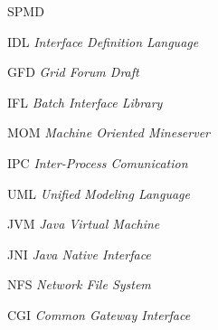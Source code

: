 \begin{listofabbrv}{SPMD}
        \item[IDL]	\emph{Interface Definition Language}
        \item[GFD]   \emph{Grid Forum Draft}
        \item[IFL]   \emph{Batch Interface Library}
        \item[MOM]   \emph{Machine Oriented Mineserver}
        \item[IPC]	\emph{Inter-Process Comunication}
        \item[UML]	\emph{Unified Modeling Language}
        \item[JVM]	\emph{Java Virtual Machine}
        \item[JNI]	\emph{Java Native Interface}
        \item[NFS]	\emph{Network File System}
        \item[CGI]	\emph{Common Gateway Interface}
\end{listofabbrv}


\listoffigures

\listoftables

